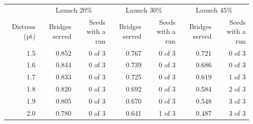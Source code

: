 \begin{tabular}{rrrrrrr}
\toprule
 & \multicolumn{2}{c}{Launch 20\%} & \multicolumn{2}{c}{Launch 30\%} & \multicolumn{2}{c}{Launch 45\%} \\
Distress (pt) & Bridges served & Seeds with a run & Bridges served & Seeds with a run & Bridges served & Seeds with a run \\
\midrule
1.5 & 0.852 & 0 of 3 & 0.767 & 0 of 3 & 0.721 & 0 of 3 \\
1.6 & 0.844 & 0 of 3 & 0.739 & 0 of 3 & 0.686 & 0 of 3 \\
1.7 & 0.833 & 0 of 3 & 0.725 & 0 of 3 & 0.619 & 1 of 3 \\
1.8 & 0.820 & 0 of 3 & 0.692 & 0 of 3 & 0.584 & 2 of 3 \\
1.9 & 0.805 & 0 of 3 & 0.670 & 0 of 3 & 0.548 & 3 of 3 \\
2.0 & 0.780 & 0 of 3 & 0.641 & 1 of 3 & 0.487 & 3 of 3 \\
\bottomrule
\end{tabular}
